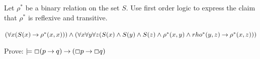 \documentclass[addpoints]{exam}
\begin{document}
\begin{questions}

\clearpage
\question[4] Let $\rho^*$ be a binary relation on the set $S$. Use first order logic to
express the claim that $\rho^*$ is reflexive and transitive.
\begin{solution}
$(\forall x (S(x) \mathbin{\rightarrow} \rho^*(x,x))) \land (\forall x\forall y \forall z (S(x)
      \land S(y) \land S(z) \land \rho^*(x,y) \land rho^*(y,z) \mathbin{\rightarrow} \rho^*(x,z)))$
\end{solution}
\vspace{50mm}



\bonusquestion[5] Prove: $\models \Box (p \mathbin{\rightarrow} q) \mathbin{\rightarrow} (\Box p \mathbin{\rightarrow} \Box q)$






\end{questions}
\end{document}
